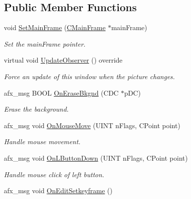 \subsection*{Public Member Functions}
\begin{DoxyCompactItemize}
\item 
void \hyperlink{class_c_view_timeline_aba069993dd75712f340999345e791327}{Set\+Main\+Frame} (\hyperlink{class_c_main_frame}{C\+Main\+Frame} $\ast$main\+Frame)
\begin{DoxyCompactList}\small\item\em Set the main\+Frame pointer. \end{DoxyCompactList}\item 
\hypertarget{class_c_view_timeline_a21388abd4726fd3dbe02b6e2ea313369}{virtual void \hyperlink{class_c_view_timeline_a21388abd4726fd3dbe02b6e2ea313369}{Update\+Observer} () override}\label{class_c_view_timeline_a21388abd4726fd3dbe02b6e2ea313369}

\begin{DoxyCompactList}\small\item\em Force an update of this window when the picture changes. \end{DoxyCompactList}\item 
afx\+\_\+msg B\+O\+O\+L \hyperlink{class_c_view_timeline_a8328ae76e5f95d36b3ab7e8bbd8ef72f}{On\+Erase\+Bkgnd} (C\+D\+C $\ast$p\+D\+C)
\begin{DoxyCompactList}\small\item\em Erase the background. \end{DoxyCompactList}\item 
afx\+\_\+msg void \hyperlink{class_c_view_timeline_a851210b0ff7efb8446857c20c553d421}{On\+Mouse\+Move} (U\+I\+N\+T n\+Flags, C\+Point point)
\begin{DoxyCompactList}\small\item\em Handle mouse movement. \end{DoxyCompactList}\item 
afx\+\_\+msg void \hyperlink{class_c_view_timeline_a70a35fb411cff2bde0354e09d794038b}{On\+L\+Button\+Down} (U\+I\+N\+T n\+Flags, C\+Point point)
\begin{DoxyCompactList}\small\item\em Handle mouse click of left button. \end{DoxyCompactList}\item 
\hypertarget{class_c_view_timeline_acb22f2662a21152e607d17dbc293351c}{afx\+\_\+msg void \hyperlink{class_c_view_timeline_acb22f2662a21152e607d17dbc293351c}{On\+Edit\+Setkeyframe} ()}\label{class_c_view_timeline_acb22f2662a21152e607d17dbc293351c}


\end{DoxyCompactItemize}
